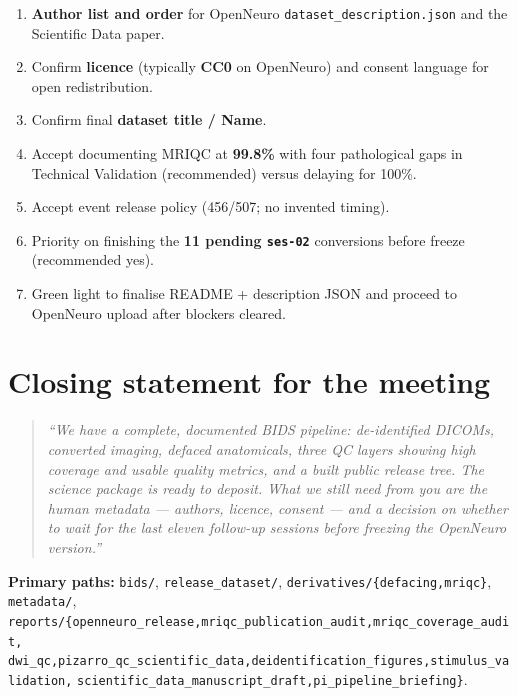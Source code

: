 \documentclass[11pt,a4paper]{article}
\begin{document}
\begin{enumerate}
\item \textbf{Author list and order} for OpenNeuro \texttt{dataset\_description.json} and the Scientific Data paper.
\item Confirm \textbf{licence} (typically \textbf{CC0} on OpenNeuro) and consent language for open redistribution.
\item Confirm final \textbf{dataset title / Name}.
\item Accept documenting MRIQC at \textbf{99.8\%} with four pathological gaps in Technical Validation
  (recommended) versus delaying for 100\%.
\item Accept event release policy (456/507; no invented timing).
\item Priority on finishing the \textbf{11 pending \texttt{ses-02}} conversions before freeze (recommended yes).
\item Green light to finalise README + description JSON and proceed to OpenNeuro upload after blockers cleared.
\end{enumerate}

\section*{Closing statement for the meeting}
\begin{quote}
\textit{``We have a complete, documented BIDS pipeline: de-identified DICOMs, converted imaging,
defaced anatomicals, three QC layers showing high coverage and usable quality metrics, and a
built public release tree. The science package is ready to deposit. What we still need from you
are the human metadata --- authors, licence, consent --- and a decision on whether to wait for
the last eleven follow-up sessions before freezing the OpenNeuro version.''}
\end{quote}

\vspace{3mm}
{\footnotesize
\textbf{Primary paths:}
\texttt{bids/}, \texttt{release\_dataset/}, \texttt{derivatives/\{defacing,mriqc\}},
\texttt{metadata/}, \texttt{reports/\{openneuro\_release,mriqc\_publication\_audit,mriqc\_coverage\_audit,}
\texttt{dwi\_qc,pizarro\_qc\_scientific\_data,deidentification\_figures,stimulus\_validation,}
\texttt{scientific\_data\_manuscript\_draft,pi\_pipeline\_briefing\}}.
}
\end{document}
